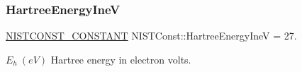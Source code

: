 \subsubsection{\texorpdfstring{Hartree\+Energy\+IneV}{HartreeEnergyIneV}}
{\footnotesize\ttfamily \mbox{\hyperlink{_n_i_s_t_const_8hpp_a2b0fc1d7452373f816175dd86ce26729}{N\+I\+S\+T\+C\+O\+N\+S\+T\+\_\+\+C\+O\+N\+S\+T\+A\+NT}} N\+I\+S\+T\+Const\+::\+Hartree\+Energy\+IneV = 27.}

$E_h \ (eV)$ Hartree energy in electron volts. 